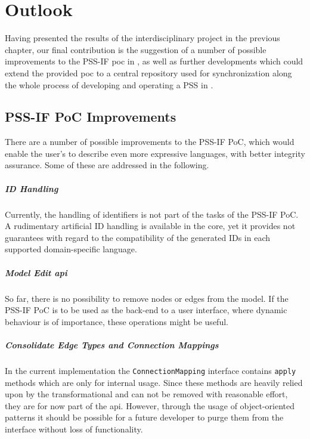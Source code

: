 \chapter{Outlook}
\label{chap:outlook}

Having presented the results of the interdisciplinary project in the previous chapter, our final contribution is the suggestion of a number of possible improvements to the PSS-IF \gls{poc} in , as well as further developments which could extend the provided \gls{poc} to a central repository used for synchronization along the whole process of developing and operating a \gls{PSS} in .

\section{PSS-IF PoC Improvements}
\label{sec:outlook:improvements}

There are a number of possible improvements to the PSS-IF PoC, which would enable the user's to describe even more expressive languages, with better integrity assurance. Some of these are addressed in the following.

\paragraph{ID Handling}

Currently, the handling of identifiers is not part of the tasks of the PSS-IF PoC. A rudimentary artificial ID handling is available in the core, yet it provides not guarantees with regard to the compatibility of the generated IDs in each supported domain-specific language.

\paragraph{Model Edit \gls{api}}

So far, there is no possibility to remove nodes or edges from the model. If the PSS-IF PoC is to be used as the back-end to a user interface, where dynamic behaviour is of importance, these operations might be useful.

\paragraph{Consolidate Edge Types and Connection Mappings}

In the current implementation the \texttt{ConnectionMapping} interface contains \texttt{apply} methods which are only for internal usage. Since these methods are heavily relied upon by the transformational and can not be removed with reasonable effort, they are for now part of the \gls{api}. However, through the usage of object-oriented patterns it should be possible for a future developer to purge them from the interface without loss of functionality.


